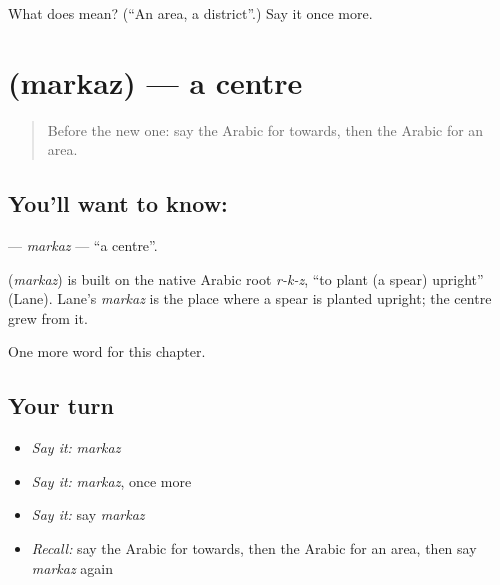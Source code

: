 \begin{tcolorbox}[breakable,colback=teal!4,colframe=teal!35!black,title={Before you move on}]
What does  mean? (\textquotedblleft{}An area, a district\textquotedblright{}.) Say it once more.
\end{tcolorbox}
\section[\texorpdfstring{\ar{مركز} (markaz)}{مركز (markaz)}]{ (markaz) — a centre}

\label{lesson:AR-C204-markaz}



\begin{quote}
Before the new one: say the Arabic for towards, then the Arabic for an area.
\end{quote}

\subsection*{You'll want to know: }
\textbf{} — \emph{markaz} — \textquotedblleft{}a centre\textquotedblright{}.

\begin{cousinweb}
\textbf{} (\emph{markaz}) is built on the native Arabic root \emph{r-k-z}, \textquotedblleft{}to plant (a spear) upright\textquotedblright{} (Lane). Lane's \emph{markaz} is the place where a spear is planted upright; the centre grew from it.
\end{cousinweb}

\begin{grammarlens}[title={What you've built}]
One more word for this chapter.
\end{grammarlens}

\subsection*{Your turn}
\begin{itemize}
\raggedright
  \item \emph{Say it:} \emph{markaz}
  \item \emph{Say it:} \emph{markaz}, once more
  \item \emph{Say it:} say \emph{markaz}
  \item \emph{Recall:} say the Arabic for towards, then the Arabic for an area, then say \emph{markaz} again
\end{itemize}

